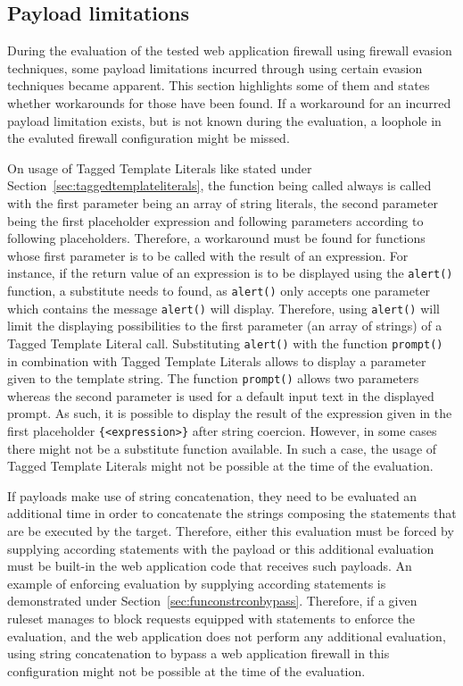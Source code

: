 \subsection{Payload limitations}
\label{sec:payloadlimitations}
During the evaluation of the tested web application firewall using firewall evasion techniques, some payload limitations incurred through using certain evasion techniques became apparent. This section highlights some of them and states whether workarounds for those have been found. If a workaround for an incurred payload limitation exists, but is not known during the evaluation, a loophole in the evaluted firewall configuration might be missed.

On usage of Tagged Template Literals like stated under Section~\ref{sec:taggedtemplateliterals}, the function being called always is called with the first parameter being an array of string literals, the second parameter being the first placeholder expression and following parameters according to following placeholders. Therefore, a workaround must be found for functions whose first parameter is to be called with the result of an expression.
For instance, if the return value of an expression is to be displayed using the \verb|alert()| function, a substitute needs to found, as \verb|alert()| only accepts one parameter which contains the message \verb|alert()| will display. \cite{js/alert} 
Therefore, using \verb|alert()| will limit the displaying possibilities to the first parameter (an array of strings) of a Tagged Template Literal call. Substituting \verb|alert()| with the function \verb|prompt()| in combination with Tagged Template Literals allows to display a parameter given to the template string. The function \verb|prompt()| allows two parameters whereas the second parameter is used for a default input text in the displayed prompt. \cite{js/prompt} 
As such, it is possible to display the result of the expression given in the first placeholder {\verb|{<expression>}|} after string coercion.
However, in some cases there might not be a substitute function available. In such a case, the usage of Tagged Template Literals might not be possible at the time of the evaluation.

If payloads make use of string concatenation, they need to be evaluated an additional time in order to concatenate the strings composing the statements that are be executed by the target. Therefore, either this evaluation must be forced by supplying according statements with the payload or this additional evaluation must be built-in the web application code that receives such payloads. An example of enforcing evaluation by supplying according statements is demonstrated under Section~\ref{sec:funconstrconbypass}. 
Therefore, if a given ruleset manages to block requests equipped with statements to enforce the evaluation, and the web application does not perform any additional evaluation, using string concatenation to bypass a web application firewall in this configuration might not be possible at the time of the evaluation.

